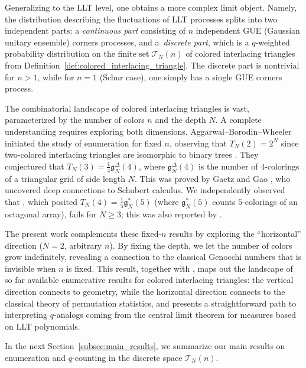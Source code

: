 \documentclass[pdftex]{sigma}
\numberwithin{equation}{section}
\theoremstyle{definition}
\begin{document}
Generalizing to the LLT level, one obtains a more complex limit object.
Namely, the distribution describing the fluctuations of LLT processes splits
into two independent parts: a \emph{continuous part}
consisting of $n$
independent GUE (Gaussian unitary ensemble) corners processes, and a~\emph{discrete part}, which is a $q$-weighted probability distribution on the
finite set $\mathcal{T}_N(n)$ of colored interlacing triangles from
Definition~\ref{def:colored_interlacing_triangle}.
The discrete part is nontrivial for $n>1$, while for $n=1$ (Schur case), one simply has
a single GUE corners process.

The combinatorial landscape of colored interlacing triangles is vast,
parameterized by the number of colors $n$ and the depth $N$.
A complete understanding requires exploring both dimensions.
Aggarwal--Borodin--Wheeler \cite{ABW2023coloured_LLT} initiated the study of
enumeration for fixed $n$, observing that $T_N(2) = 2^N$ since two-colored
interlacing triangles are isomorphic to binary trees
\cite[Proposition~A.1]{ABW2023coloured_LLT}.
They conjectured \cite[Conjecture~A.3]{ABW2023coloured_LLT} that
$T_N(3) = \frac{1}{4}\mathfrak{g}_N^{\Delta}(4)$, where
$\mathfrak{g}_N^{\Delta}(4)$ \cite[A153467]{OEIS} is the number of $4$-colorings
of a triangular grid of side length $N$.
This was proved by Gaetz and Gao \cite{gaetz2023bijection}, who uncovered deep
connections to Schubert calculus.
We independently observed that \cite[Conjecture~A.5]{ABW2023coloured_LLT}, which
posited $T_N(4) = \frac{1}{5}\mathfrak{g}_N^{*}(5)$ (where
$\mathfrak{g}_N^{*}(5)$ \cite[A068294]{OEIS} counts $5$-colorings of an
octagonal array), fails for $N \ge 3$; this was also reported by
\cite{gaetz2023bijection}.

The present work complements these fixed-$n$ results by exploring the
``horizontal'' direction ($N=2$, arbitrary $n$).
By fixing the depth, we let the number of colors grow indefinitely, revealing a
connection to the classical Genocchi numbers that is invisible when $n$ is
fixed.
This result, together with \cite{gaetz2023bijection}, maps out the landscape of
so far available enumerative results for colored interlacing triangles: the
vertical direction connects to geometry, while the horizontal direction connects
to the classical theory of permutation statistics, and presents a
straightforward path to interpreting $q$-analogs coming from the central limit
theorem for measures based on LLT polynomials.

In the next Section~\ref{subsec:main_results}, we summarize our main results on
enumeration and $q$-counting in the discrete space $\mathcal{T}_N(n)$.
\end{document}

